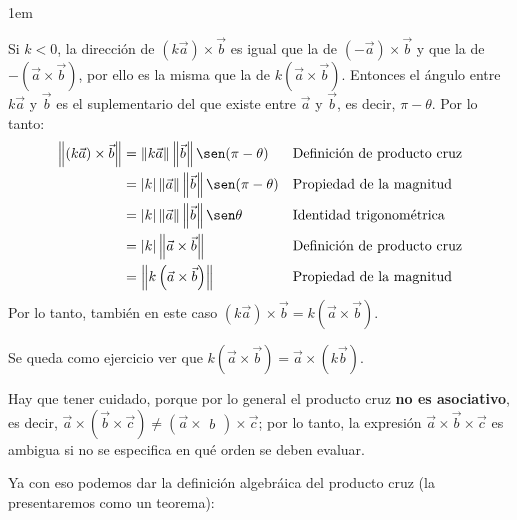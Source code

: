 \documentclass[12pt, fleqn]{report}                             %
\newenvironment{SmallIndentation}[1][0.75em]                    %
        {\begin{adjustwidth}{#1}{}\begin{footnotesize}}             %
        {\end{footnotesize}\end{adjustwidth}}                       %
\theoremstyle{break}                                            %
\newcommand{\Wrap}[1]{\left( #1 \right)}                        %
\newcommand{\abs}[1]{\left\lvert #1 \right\lvert}               %
\newcommand{\Abs}[1]{\left\lVert #1 \right\lVert}               %
\newcommand{\Vector}[1]                                         %
        { \ensuremath{\begin{matrix}#1\end{matrix}} }               %
\begin{document}
\begin{SmallIndentation}[1em]
\begin{itemize}
                    Si $k<0$, la dirección de $\Wrap{k\vec{a}} \times \vec{b}$ es igual que la de $\Wrap{-\vec{a}} \times \vec{b}$ y que la de $-\Wrap{\vec{a} \times \vec{b}}$, por ello es la misma que la de $k\Wrap{\vec{a} \times \vec{b}}$. Entonces el ángulo entre $k\vec{a}$ y $\vec{b}$ es el suplementario del que existe entre $\vec{a}$ y $\vec{b}$, es decir, $\pi-\theta$. Por lo tanto:
                    \begin{align*}
                        \Abs{(k\vec{a}) \times \vec{b}} &= \Abs{k\vec{a}} \Abs{\vec{b}} \sen(\pi-\theta) &&\mbox{Definición de producto cruz}\\
                        &= \abs{k} \Abs{\vec{a}} \Abs{\vec{b}} \sen(\pi-\theta) &&\mbox{Propiedad de la magnitud}\\
                        &= \abs{k} \Abs{\vec{a}} \Abs{\vec{b}} \sen \theta &&\mbox{Identidad trigonométrica}\\
                        &= \abs{k} \Abs{\vec{a} \times \vec{b}} && \mbox{Definición de producto cruz}\\
                        &= \Abs{k\Wrap{\vec{a} \times \vec{b}}} && \mbox{Propiedad de la magnitud}
                    \end{align*}
                    Por lo tanto, también en este caso $\Wrap{k\vec{a}} \times \vec{b} = k\Wrap{\vec{a} \times \vec{b}}$.
                    
                    Se queda como ejercicio ver que $k\Wrap{\vec{a} \times \vec{b}} = \vec{a} \times \Wrap{k \vec{b}}$.
                \end{itemize}
            \end{SmallIndentation}
        
            Hay que tener cuidado, porque por lo general el producto cruz \textbf{no es asociativo}, es decir, $\vec{a} \times \Wrap{\vec{b} \times \vec{c}} \neq \Wrap{\vec{a} \times \Vector{b}} \times \vec{c}$; por lo tanto, la expresión $\vec{a} \times \vec{b} \times \vec{c}$ es ambigua si no se especifica en qué orden se deben evaluar.
            
            Ya con eso podemos dar la definición algebráica del producto cruz (la presentaremos como un teorema):
            
            
\end{document}
